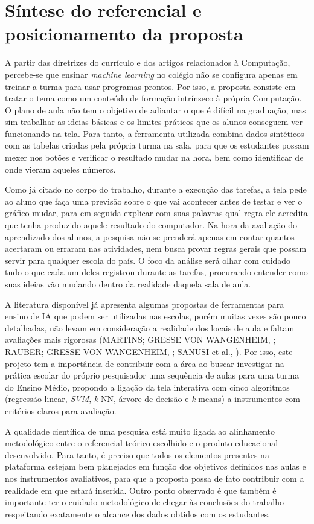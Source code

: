 \section{Síntese do referencial e posicionamento da proposta}

A partir das diretrizes do currículo e dos artigos relacionados à Computação, percebe-se que ensinar \textit{machine learning} no colégio não se configura apenas em treinar a turma para usar programas prontos. Por isso, a proposta consiste em tratar o tema como um conteúdo de formação intrínseco à própria Computação. O plano de aula não tem o objetivo de adiantar o que é difícil na graduação, mas sim trabalhar as ideias básicas e os limites práticos que os alunos conseguem ver funcionando na tela. Para tanto, a ferramenta utilizada combina dados sintéticos com as tabelas criadas pela própria turma na sala, para que os estudantes possam mexer nos botões e verificar o resultado mudar na hora, bem como identificar de onde vieram aqueles números.

Como já citado no corpo do trabalho, durante a execução das tarefas, a tela pede ao aluno que faça uma previsão sobre o que vai acontecer antes de testar e ver o gráfico mudar, para em seguida explicar com suas palavras qual regra ele acredita que tenha produzido aquele resultado do computador. Na hora da avaliação do aprendizado dos alunos, a pesquisa não se prenderá apenas em contar quantos acertaram ou erraram nas atividades, nem busca provar regras gerais que possam servir para qualquer escola do país. O foco da análise será olhar com cuidado tudo o que cada um deles registrou durante as tarefas, procurando entender como suas ideias vão mudando dentro da realidade daquela sala de aula.

A literatura disponível já apresenta algumas propostas de ferramentas para ensino de IA que podem ser utilizadas nas escolas, porém muitas vezes são pouco detalhadas, não levam em consideração a realidade dos locais de aula e faltam avaliações mais rigorosas (\MakeUppercase{MARTINS; GRESSE VON WANGENHEIM}, \citeyear{martins2023findings}; \MakeUppercase{RAUBER; GRESSE VON WANGENHEIM}, \citeyear{rauber2023assessing}; \MakeUppercase{SANUSI} et al., \citeyear{sanusi2023systematic}). Por isso, este projeto tem a importância de contribuir com a área ao buscar investigar na prática escolar do próprio pesquisador uma sequência de aulas para uma turma do Ensino Médio, propondo a ligação da tela interativa com cinco algoritmos (regressão linear, \textit{SVM}, \textit{k}-NN, árvore de decisão e \textit{k}-means) a instrumentos com critérios claros para avaliação.

A qualidade científica de uma pesquisa está muito ligada ao alinhamento metodológico entre o referencial teórico escolhido e o produto educacional desenvolvido. Para tanto, é preciso que todos os elementos presentes na plataforma estejam bem planejados em função dos objetivos definidos nas aulas e nos instrumentos avaliativos, para que a proposta possa de fato contribuir com a realidade em que estará inserida. Outro ponto observado é que também é importante ter o cuidado metodológico de chegar às conclusões do trabalho respeitando exatamente o alcance dos dados obtidos com os estudantes.
